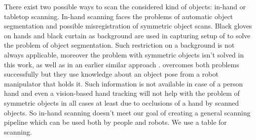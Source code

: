 \documentclass[letterpaper, 10 pt, conference]{ieeeconf}  %
\begin{document}
There exist two possible ways to scan the considered kind of objects: 
in-hand or tabletop scanning. In-hand scanning faces the problems
of automatic object segmentation and possible misregistration of symmetric object scans. 
Black gloves on hands and black curtain as background are used in capturing setup of \cite{weise2011online}
to solve the problem of object segmentation. Such restriction on a background is not always applicable,
moreover the problem with symmetric objects isn't solved in this work, 
as well as in an earlier similar approach \cite{rusinkiewicz2002real}.
\cite{krainin2011manipulator} overcomes both problems successfully but
they use knowledge about an object pose from a robot manipulator
that holds it. Such information is not available in case of a person hand
and even a vision-based hand tracking will not help with the problem of symmetric
objects in all cases at least due to occlusions of a hand by scanned objects. 
So in-hand scanning doesn't meet our goal of
creating a general scanning pipeline which can be used both by people and robots.
We use a table for scanning.
\end{document}
